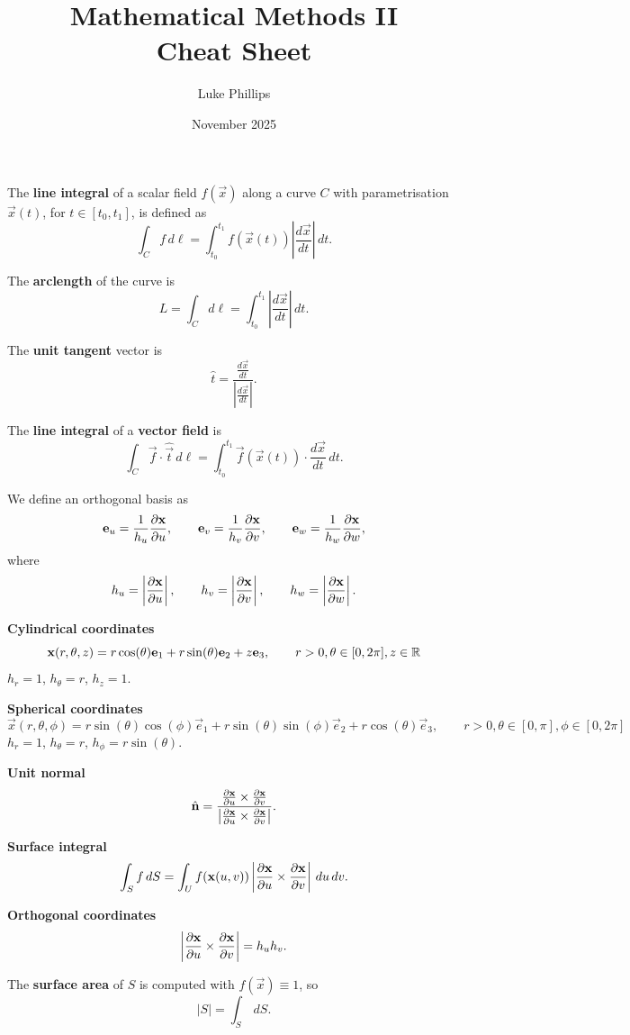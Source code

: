 \documentclass[10pt, a4paper]{article}
\title{Mathematical Methods II \\
    \large Cheat Sheet}
\author{Luke Phillips}
\date{November 2025}
\begin{document}
\maketitle

\newpage

The \textbf{line integral} of a scalar field $f(\vec{x})$ along a curve $C$ with parametrisation $\vec{x}(t)$,
for $t \in [t_0, t_1]$,
is defined as
\[
\int_{C}f\,d\ell = \int_{t_0}^{t_1}f(\vec{x}(t))\left|\frac{d\vec{x}}{dt}\right|\,dt.
\]

The \textbf{arclength} of the curve is
\[
L = \int_{C}d\ell = \int_{t_0}^{t_1}\left|\frac{d\vec{x}}{dt}\right|\,dt.
\]

The \textbf{unit tangent} vector is
\[
\hat{t} = \frac{\frac{d\vec{x}}{dt}}{\left|\frac{d\vec{x}}{dt}\right|}.
\]

The \textbf{line integral} of a \textbf{vector field} is
\[
\int_{C}\vec{f}\cdot\hat{\vec{t}}\,d\ell = \int_{t_0}^{t_1}\vec{f}(\vec{x}(t))\cdot\frac{d\vec{x}}{dt}\,dt.
\]

We define an orthogonal basis as
\[
\vec{e}_u = \frac{1}{h_u}\pd[\vec{x}]{u},\qquad\vec{e}_v = \frac{1}{h_v}\pd[\vec{x}]{v},\qquad\vec{e}_w = \frac{1}{h_w}\pd[\vec{x}]{w},
\]
where
\[
h_u = \left|\pd[\vec{x}]{u}\right|,\qquad h_v = \left|\pd[\vec{x}]{v}\right|,\qquad h_w = \left|\pd[\vec{x}]{w}\right|.
\]

\textbf{Cylindrical coordinates}
\[
\vec{x}(r, \theta, z) = r\cos(\theta)\vec{e}_1 + r\sin(\theta)\vec{e}_2 + z\vec{e}_3,\qquad r > 0, \theta \in [0, 2\pi], z \in \R
\]
$h_r = 1$,
$h_{\theta} = r$,
$h_z = 1$.

\textbf{Spherical coordinates}
\[
\vec{x}(r, \theta, \phi) = r\sin(\theta)\cos(\phi)\vec{e}_1 + r\sin(\theta)\sin(\phi)\vec{e}_2 + r\cos(\theta)\vec{e}_3,\qquad r > 0, \theta \in [0, \pi], \phi \in [0, 2\pi]
\]
$h_r = 1$,
$h_{\theta} = r$,
$h_{\phi} = r\sin(\theta)$.


\textbf{Unit normal}
\[
\hat{\vec{n}} = \frac{\pd[\vec{x}]{u} \times \pd[\vec{x}]{v}}{\left|\pd[\vec{x}]{u} \times \pd[\vec{x}]{v}\right|}.
\]


\textbf{Surface integral}
\[
\int_{S}f\,dS = \int_{U}f(\vec{x}(u, v))\left|\pd[\vec{x}]{u} \times \pd[\vec{x}]{v}\right|\,du\,dv.
\]

\textbf{Orthogonal coordinates}
\[
\left|\pd[\vec{x}]{u}\times\pd[\vec{x}]{v}\right| = h_uh_v.
\]

The \textbf{surface area} of $S$ is computed with $f(\vec{x}) \equiv 1$,
so
\[
|S| = \int_{S}\,dS.
\]
\end{document}
